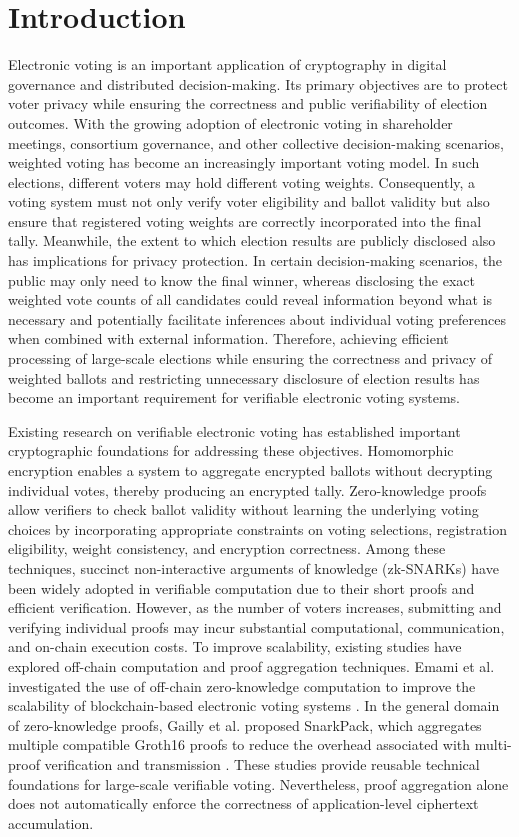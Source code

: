 \documentclass[pdflatex,sn-mathphys-num]{sn-jnl}%
\theoremstyle{thmstyleone}%
\theoremstyle{thmstyletwo}%
\theoremstyle{thmstylethree}%
\begin{document}
\section{Introduction}\label{sec1}

Electronic voting is an important application of cryptography in digital governance and
distributed decision-making. Its primary objectives are to protect voter privacy while
ensuring the correctness and public verifiability of election outcomes. With the growing
adoption of electronic voting in shareholder meetings, consortium governance, and other
collective decision-making scenarios, weighted voting has become an increasingly
important voting model. In such elections, different voters may hold different voting
weights. Consequently, a voting system must not only verify voter eligibility and ballot
validity but also ensure that registered voting weights are correctly incorporated into
the final tally. Meanwhile, the extent to which election results are publicly disclosed
also has implications for privacy protection. In certain decision-making scenarios, the
public may only need to know the final winner, whereas disclosing the exact weighted
vote counts of all candidates could reveal information beyond what is necessary and
potentially facilitate inferences about individual voting preferences when combined with
external information. Therefore, achieving efficient processing of large-scale elections
while ensuring the correctness and privacy of weighted ballots and restricting
unnecessary disclosure of election results has become an important requirement for
verifiable electronic voting systems.

Existing research on verifiable electronic voting has established important
cryptographic foundations for addressing these objectives. Homomorphic encryption
enables a system to aggregate encrypted ballots without decrypting individual votes,
thereby producing an encrypted tally. Zero-knowledge proofs allow verifiers to check
ballot validity without learning the underlying voting choices by incorporating
appropriate constraints on voting selections, registration eligibility, weight
consistency, and encryption correctness. Among these techniques, succinct
non-interactive arguments of knowledge (zk-SNARKs) have been widely adopted in
verifiable computation due to their short proofs and efficient verification. However, as
the number of voters increases, submitting and verifying individual proofs may incur
substantial computational, communication, and on-chain execution costs. To improve
scalability, existing studies have explored off-chain computation and proof aggregation
techniques. Emami et al. investigated the use of off-chain zero-knowledge computation to
improve the scalability of blockchain-based electronic voting systems \cite{bib138}. In
the general domain of zero-knowledge proofs, Gailly et al. proposed SnarkPack, which
aggregates multiple compatible Groth16 proofs to reduce the overhead associated with
multi-proof verification and transmission \cite{bib128}. These studies provide reusable
technical foundations for large-scale verifiable voting. Nevertheless, proof aggregation
alone does not automatically enforce the correctness of application-level ciphertext
accumulation.
\end{document}
